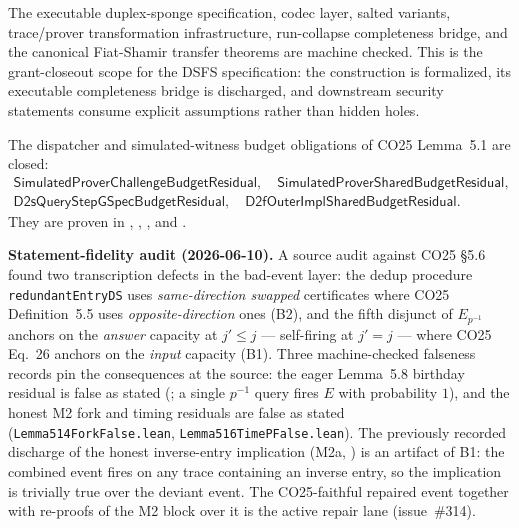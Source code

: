 \begin{remark}
    The executable duplex-sponge specification, codec layer, salted variants, trace/prover
    transformation infrastructure, run-collapse completeness bridge, and the canonical
    Fiat-Shamir transfer theorems are machine checked. This is the grant-closeout scope for
    the DSFS specification: the construction is formalized, its executable completeness bridge
    is discharged, and downstream security statements consume explicit assumptions rather than
    hidden holes.

    The dispatcher and simulated-witness budget obligations of CO25 Lemma~5.1 are closed:
    \[
    \begin{gathered}
    \mathsf{SimulatedProverChallengeBudgetResidual},\quad
    \mathsf{SimulatedProverSharedBudgetResidual},\\
    \mathsf{D2sQueryStepGSpecBudgetResidual},\quad
    \mathsf{D2fOuterImplSharedBudgetResidual}.
    \end{gathered}
    \]
    They are proven in ,
    ,
    , and
    .

    \textbf{Statement-fidelity audit (2026-06-10).} A source audit against CO25
    \S5.6 found two transcription defects in the bad-event layer: the dedup procedure
    \texttt{redundantEntryDS} uses \emph{same-direction swapped} certificates where CO25
    Definition~5.5 uses \emph{opposite-direction} ones (B2), and the fifth disjunct of
    $E_{p^{-1}}$ anchors on the \emph{answer} capacity at $j' \le j$ — self-firing at
    $j' = j$ — where CO25 Eq.~26 anchors on the \emph{input} capacity (B1). Three
    machine-checked falseness records pin the consequences at the source: the eager
    Lemma~5.8 birthday residual is false as stated
    (; a single
    $p^{-1}$ query fires $E$ with probability $1$), and the honest M2 fork and timing
    residuals are false as stated (\texttt{Lemma514ForkFalse.lean},
    \texttt{Lemma516TimePFalse.lean}). The previously recorded discharge of the honest
    inverse-entry implication (M2a, ) is an
    artifact of B1: the combined event fires on any trace containing an inverse entry, so
    the implication is trivially true over the deviant event. The CO25-faithful repaired
    event together with re-proofs of the M2 block over it is the active repair lane
    (issue~\#314).


\end{remark}
